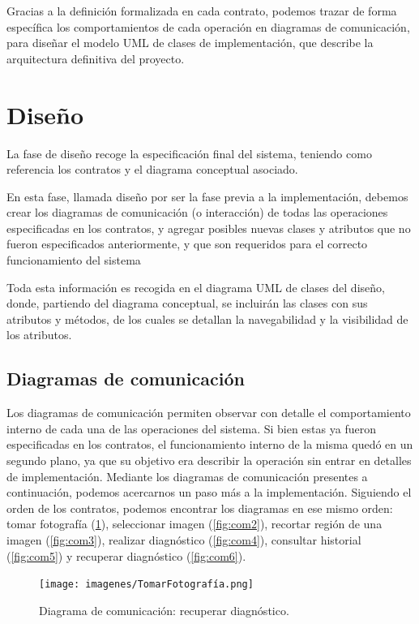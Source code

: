  Gracias a la definición formalizada en cada contrato, podemos trazar de forma específica los comportamientos de cada operación en diagramas de comunicación, para diseñar el modelo UML de clases de implementación, que describe la arquitectura definitiva del proyecto.
 
 \section{Diseño}
 
 La fase de diseño recoge la especificación final del sistema, teniendo como referencia los contratos y el diagrama conceptual asociado.
 
 En esta fase, llamada diseño por ser la fase previa a la implementación,  debemos crear los diagramas de comunicación (o interacción) de todas las
 operaciones especificadas en los contratos, y agregar posibles nuevas clases y atributos que no fueron especificados anteriormente, y que son requeridos para el correcto funcionamiento del sistema
 
 Toda esta información es recogida en el diagrama UML de clases del diseño, donde, partiendo del diagrama conceptual, se incluirán las clases con sus atributos y métodos, de los cuales se detallan la navegabilidad y la visibilidad de los atributos.
 
 \subsection{Diagramas de comunicación}
 
 Los diagramas de comunicación permiten observar con detalle el comportamiento interno de cada una de las operaciones del sistema. Si bien estas ya fueron especificadas en los contratos, el funcionamiento interno de la misma quedó en un segundo plano, ya que su objetivo era describir la operación sin entrar en detalles de implementación. Mediante los diagramas de comunicación presentes a continuación, podemos acercarnos un paso más a la implementación. Siguiendo el orden de los contratos, podemos encontrar los diagramas  en ese mismo orden: tomar fotografía (\ref{fig:com1}),  seleccionar imagen (\ref{fig:com2}), recortar región de una imagen (\ref{fig:com3}), realizar diagnóstico (\ref{fig:com4}), consultar historial (\ref{fig:com5}) y recuperar diagnóstico (\ref{fig:com6}).
 
\begin{figure}[H]
 	\centering
 	\texttt{[image: imagenes/TomarFotografía.png]}
 	\caption{Diagrama de comunicación: recuperar diagnóstico.}
 	\label{fig:com1}
 \end{figure}
 
